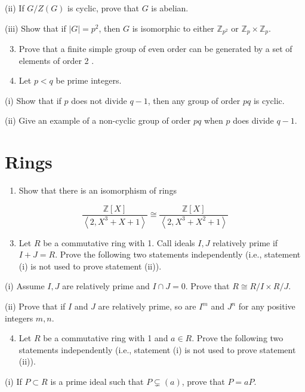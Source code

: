 \documentclass[10pt]{article}
\begin{document}
(ii) If $G / Z(G)$ is cyclic, prove that $G$ is abelian.

(iii) Show that if $|G|=p^{2}$, then $G$ is isomorphic to either $\mathbb{Z}_{p^{2}}$ or $\mathbb{Z}_{p} \times \mathbb{Z}_{p}$.

\begin{enumerate}
  \setcounter{enumi}{2}
  \item Prove that a finite simple group of even order can be generated by a set of elements of order 2 .

  \item Let $p<q$ be prime integers.

\end{enumerate}
(i) Show that if $p$ does not divide $q-1$, then any group of order $p q$ is cyclic.

(ii) Give an example of a non-cyclic group of order $p q$ when $p$ does divide $q-1$.

\section{Rings}
\begin{enumerate}
  \item Show that there is an isomorphism of rings
\end{enumerate}
$$
\frac{\mathbb{Z}[X]}{\left\langle 2, X^{3}+X+1\right\rangle} \cong \frac{\mathbb{Z}[X]}{\left\langle 2, X^{3}+X^{2}+1\right\rangle}
$$

\begin{enumerate}
  \setcounter{enumi}{2}
  \item Let $R$ be a commutative ring with 1. Call ideals $I, J$ relatively prime if $I+J=R$. Prove the following two statements independently (i.e., statement (i) is not used to prove statement (ii)).
\end{enumerate}
(i) Assume $I, J$ are relatively prime and $I \cap J=0$. Prove that $R \cong R / I \times R / J$.

(ii) Prove that if $I$ and $J$ are relatively prime, so are $I^{m}$ and $J^{n}$ for any positive integers $m, n$.

\begin{enumerate}
  \setcounter{enumi}{3}
  \item Let $R$ be a commutative ring with 1 and $a \in R$. Prove the following two statements independently (i.e., statement (i) is not used to prove statement (ii)).
\end{enumerate}
(i) If $P \subset R$ is a prime ideal such that $P \subsetneq(a)$, prove that $P=a P$.
\end{document}
